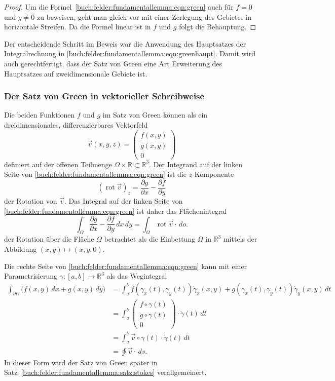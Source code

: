 \begin{proof}
Um die Formel~\eqref{buch:felder:fundamentallemma:eqn:green} auch
für $f=0$ und $g\ne 0$ zu beweisen, geht man gleich vor mit 
einer Zerlegung des Gebietes in horizontale Streifen.
Da die Formel linear ist in $f$ und $g$ folgt die Behauptung.
\end{proof}

Der entscheidende Schritt im Beweis war die Anwendung des Hauptsatzes
der Integralrechnung in
\eqref{buch:felder:fundamentallemma:eqn:greenhaupt}.
Damit wird auch gerechtfertigt, dass der Satz von Green eine Art
Erweiterung des Hauptsatzes auf zweidimensionale Gebiete ist.

%
%
\subsubsection{Der Satz von Green in vektorieller Schreibweise}
Die beiden Funktionen $f$ und $g$ im Satz von Green können als
ein dreidimensionales, differenzierbares Vektorfeld
\[
\vec{v}(x,y,z)
=
\begin{pmatrix}
f(x,y)\\
g(x,y)\\
0
\end{pmatrix}
\]
definiert auf der offenen Teilmenge $\Omega\times\mathbb{R}\subset\mathbb{R}^3$.
Der Integrand auf der linken Seite von
\eqref{buch:felder:fundamentallemma:eqn:green} ist die $z$-Komponente
\[
(\operatorname{rot}\vec{v})_z
=
\frac{\partial g}{\partial x}-\frac{\partial f}{\partial y}
\]
der Rotation von $\vec{v}$.
Das Integral auf der linken Seite von
\eqref{buch:felder:fundamentallemma:eqn:green}
ist daher das Flächenintegral
\[
\int_\Omega
\frac{\partial g}{\partial x}-\frac{\partial f}{\partial y}\,dx\,dy
=
\int_\Omega
\operatorname{rot} \vec{v}
\cdot \,do.
\]
der Rotation über die Fläche $\Omega$ betrachtet als die Einbettung
$\Omega$ in $\mathbb{R}^3$ mittels der Abbildung $(x,y)\mapsto (x,y,0)$.

Die rechte Seite von
\eqref{buch:felder:fundamentallemma:eqn:green} kann mit einer
Parametrisierung $\gamma\colon [a,b]\to \mathbb{R}^3$ 
als das Wegintegral
\begin{align*}
\int_{\partial\Omega} \bigl(f(x,y)\,dx + g(x,y)\,dy\bigr)
&=
\int_a^b
f(\gamma_x(t),\gamma_y(t))\dot{\gamma}_x(x,y)
+
g(\gamma_x(t),\gamma_y(t))\dot{\gamma}_y(x,y)
\,dt
\\
&=
\int_a^b
\begin{pmatrix}
f\circ\gamma(t)\\
g\circ\gamma(t)\\
0
\end{pmatrix}
\cdot
\dot{\gamma}(t)
\,dt
\\
&=
\int_a^b
\vec{v}\circ\gamma(t)
\cdot
\dot{\gamma}(t)
\,dt
\\
&=
\oint \vec{v}\cdot\,ds.
\end{align*}
In dieser Form wird der Satz von Green später in
Satz~\ref{buch:felder:fundamentallemma:satz:stokes} verallgemeinert.

